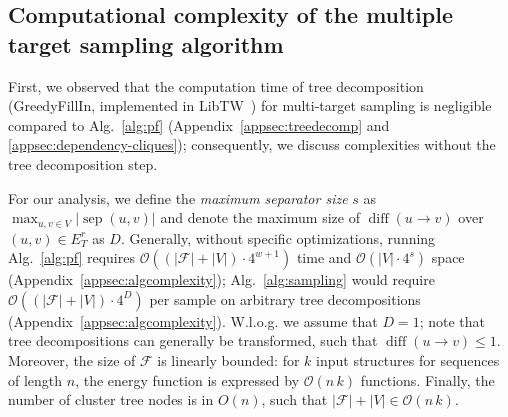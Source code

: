 \documentclass{bioinfo}
\newcommand{\separator}[2]{\operatorname{sep}(#1,#2)}
\newcommand{\difference}[2]{\operatorname{diff}(#1 \rightarrow #2)}
\newcommand{\F}{\mathcal{F}}
\newcommand{\edgesToR}{E^r_T}
\newcommand{\Software}[1]{{\ttfamily #1}}
\begin{document}
\subsection{Computational complexity of the multiple target sampling algorithm}\label{sec:complexity}


First, we observed that the computation time of tree decomposition
(\Software{GreedyFillIn}, implemented in \Software{LibTW}~\cite{Dijk2006}) for multi-target
sampling is negligible compared to Alg.~\ref{alg:pf} (Appendix~\ref{appsec:treedecomp} and \ref{appsec:dependency-cliques});
consequently, we discuss complexities without the tree decomposition
step.

For our analysis, we define the \emph{maximum separator size} $s$ as
$\max_{u,v\in V} | \separator{u}{v} |$ and denote the maximum size of
$\difference{u}{v}$ over $(u,v)\in\edgesToR{}$ as $D$.  Generally,
without specific optimizations, running Alg.~\ref{alg:pf} requires
$\mathcal{O}((|\F|+|V|)\cdot 4^{w+1})$ time and $\mathcal{O}(|V|\cdot4^s)$ space (Appendix~\ref{appsec:algcomplexity});
Alg.~\ref{alg:sampling} would require $\mathcal{O}((|\F|+|V|)\cdot 4^D)$ per
sample on arbitrary tree decompositions (Appendix~\ref{appsec:algcomplexity}). W.l.o.g. we assume that
$D=1$; note that tree decompositions can generally be transformed,
such that $\difference{u}{v}\leq 1$.
%
Moreover, the size of $\F$ is linearly bounded: for $k$
input structures for sequences of length $n$, the energy function is
expressed by $\mathcal{O}(n\,k)$ functions. Finally, the number of cluster
tree nodes is in $O(n)$, such that $|\F|+|V| \in \mathcal{O}(n\,k)$.
\end{document}

